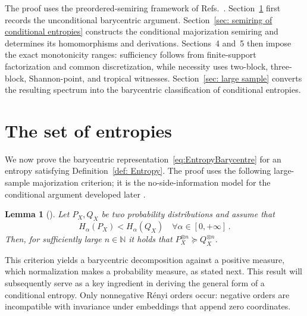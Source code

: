 \documentclass[aps,pra,11pt,onecolumn,nofootinbib,tightenlines]{revtex4-2}
\newtheorem{lemma}[theorem]{Lemma}
\theoremstyle{definition}
\begin{document}
The proof uses the preordered-semiring framework of
Refs.~\cite{fritz2023abstract,fritz2023abstractII}.  Section~\ref{sec: set of entropies}
first records the unconditional barycentric argument.
Section~\ref{sec: semiring of conditional entropies} constructs the conditional
majorization semiring and determines its homomorphisms and derivations.
Sections~4 and~5 then impose the exact monotonicity ranges: sufficiency follows
from finite-support factorization and common discretization, while necessity
uses two-block, three-block, Shannon-point, and tropical witnesses.
Section~\ref{sec: large sample} converts the resulting spectrum into the
barycentric classification of conditional entropies.

\section{The set of entropies}
\label{sec: set of entropies}
We now prove the barycentric representation~\eqref{eq:EntropyBarycentre} for an
entropy satisfying Definition~\ref{def: Entropy}.  The proof uses the following
large-sample majorization criterion; it is the no-side-information model for
the conditional argument developed later
\cite{mu21_renyi,gour21_axiomatic,haapasalo_inprep}.
\begin{lemma}[{\cite[Proposition 3.7]{Jensen_Kjaerulf_2019}}]\label{lemma:Jensen}
Let $P_X,Q_X$ be two probability distributions and assume that
\begin{equation}
    H_\alpha(P_X) < H_\alpha(Q_X)  \quad \forall \alpha\in[0,+\infty] \,.
\end{equation}
Then, for sufficiently large $n \in \mathbb{N}$ it holds that
$P_X^{\otimes n} \succeq Q_X^{\otimes n}$.
\end{lemma}
This criterion yields a barycentric decomposition against a positive measure,
which normalization makes a probability measure, as stated next.
This result will subsequently serve as a key ingredient in deriving the general
form of a conditional entropy.  Only nonnegative R\'enyi orders occur: negative
orders are incompatible with invariance under embeddings that append zero
coordinates.
\end{document}
